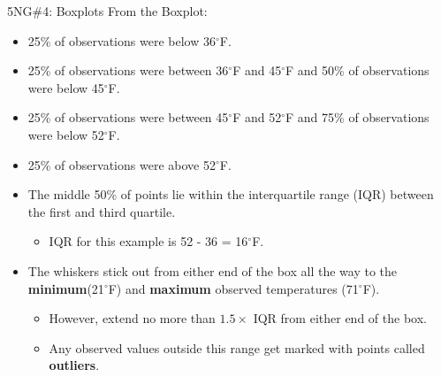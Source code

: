 \documentclass[
  ignorenonframetext,
]{beamer}
\providecommand{\tightlist}{%
  \setlength{\itemsep}{0pt}\setlength{\parskip}{0pt}}
\begin{document}
\begin{frame}{5NG\#4: Boxplots}
\protect\hypertarget{ng4-boxplots-2}{}
From the Boxplot:

\begin{itemize}
\item
  25\% of observations were below 36\(^{\circ}\)F.
\item
  25\% of observations were between 36\(^{\circ}\)F and 45\(^{\circ}\)F
  and 50\% of observations were below 45\(^{\circ}\)F.
\item
  25\% of observations were between 45\(^{\circ}\)F and 52\(^{\circ}\)F
  and 75\% of observations were below 52\(^{\circ}\)F.
\item
  25\% of observations were above 52\(^{\circ}\)F.
\item
  The middle 50\% of points lie within the interquartile range (IQR)
  between the first and third quartile.

  \begin{itemize}
  \tightlist
  \item
    IQR for this example is 52 - 36 = 16\(^{\circ}\)F.
  \end{itemize}
\item
  The whiskers stick out from either end of the box all the way to the
  \textbf{minimum}(21\(^{\circ}\)F) and \textbf{maximum} observed
  temperatures (71\(^{\circ}\)F).

  \begin{itemize}
  \tightlist
  \item
    However, extend no more than \(1.5 \times\) IQR from either end of
    the box.
  \item
    Any observed values outside this range get marked with points called
    \textbf{outliers}.
  \end{itemize}
\end{itemize}
\end{frame}
\end{document}
